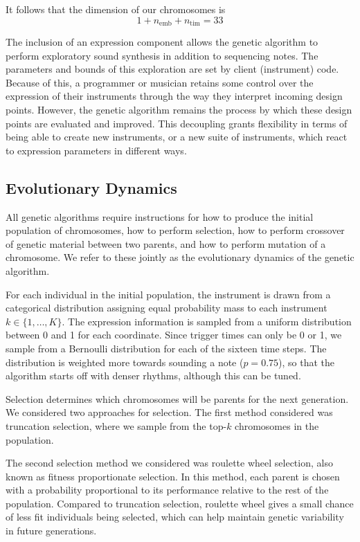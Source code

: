 \documentclass[conference]{IEEEtran}
\begin{document}
It follows that the dimension of our chromosomes is
\begin{equation}
    1 + n_\text{emb} + n_\text{tim} = 33
\end{equation}

The inclusion of an expression component allows the genetic algorithm to
perform exploratory  sound synthesis in addition to sequencing notes. The
parameters and bounds of this exploration are set by client (instrument) code.
Because of this, a programmer or musician retains some control over the
expression of their instruments through the way they interpret incoming design
points. However, the genetic algorithm remains the process by which these
design points are evaluated and improved. This decoupling grants flexibility in
terms of being able to create new instruments, or a new suite of instruments,
which react to expression parameters in different ways.

\subsection{Evolutionary Dynamics}

All genetic algorithms require instructions for how to produce the initial
population of chromosomes, how to perform selection, how to perform crossover
of genetic material between two parents, and how to perform mutation of a
chromosome. We refer to these jointly as the evolutionary dynamics of the
genetic algorithm.

For each individual in the initial population, the instrument is drawn from a
categorical distribution assigning equal probability mass to each instrument
$k \in \{1, \dots, K\}$. The expression information is sampled from a uniform
distribution between 0 and 1 for each coordinate. Since trigger times can only
be 0 or 1, we sample from a Bernoulli distribution for each of the sixteen time
steps. The distribution is weighted more towards sounding a note
($p=0.75$), so that the algorithm starts off with denser rhythms,
although this can be tuned.

Selection determines which chromosomes will be parents for the next generation.
We considered two approaches for selection. The first method considered was
truncation selection, where we sample from the top-$k$
chromosomes in the population.

The second selection method we considered was roulette wheel selection, also
known as fitness proportionate selection. In this method, each parent is chosen
with a probability proportional to its performance relative to the rest of the
population. Compared to truncation selection, roulette wheel gives a small
chance of less fit individuals being selected, which can help maintain genetic
variability in future generations.
\end{document}

